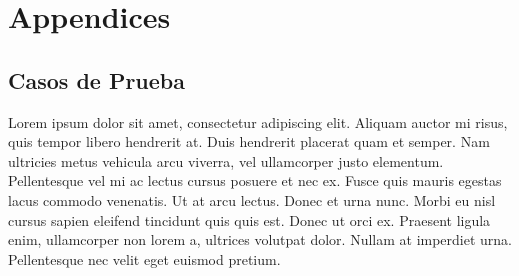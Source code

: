 \documentclass[a4paper]{CSMakotoTechnicalReport}
\begin{document}
\newpage

\section*{Appendices}

\begin{appendices}

    \section{Casos de Prueba}

    Lorem ipsum dolor sit amet, consectetur adipiscing elit. Aliquam auctor mi risus, quis tempor libero hendrerit at. Duis hendrerit placerat quam et semper. Nam ultricies metus vehicula arcu viverra, vel ullamcorper justo elementum. Pellentesque vel mi ac lectus cursus posuere et nec ex. Fusce quis mauris egestas lacus commodo venenatis. Ut at arcu lectus. Donec et urna nunc. Morbi eu nisl cursus sapien eleifend tincidunt quis quis est. Donec ut orci ex. Praesent ligula enim, ullamcorper non lorem a, ultrices volutpat dolor. Nullam at imperdiet urna. Pellentesque nec velit eget euismod pretium.

\end{appendices}

\end{document}

